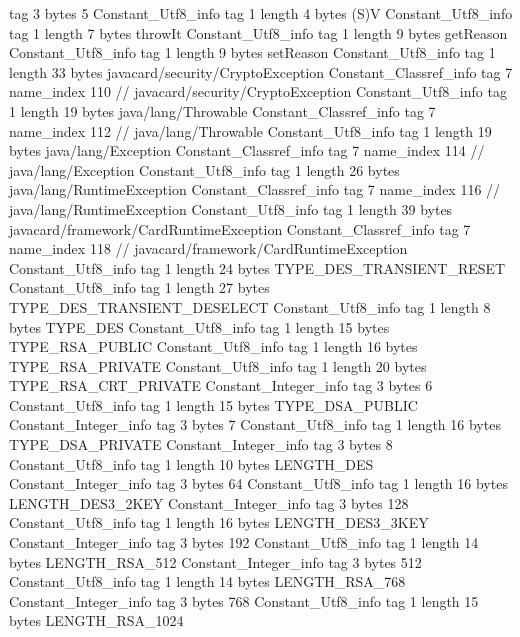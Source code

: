 {{{			tag	3
			bytes	5
		}
		Constant_Utf8_info {
			tag	1
			length	4
			bytes	(S)V
		}
		Constant_Utf8_info {
			tag	1
			length	7
			bytes	throwIt
		}
		Constant_Utf8_info {
			tag	1
			length	9
			bytes	getReason
		}
		Constant_Utf8_info {
			tag	1
			length	9
			bytes	setReason
		}
		Constant_Utf8_info {
			tag	1
			length	33
			bytes	javacard/security/CryptoException
		}
		Constant_Classref_info {
			tag	7
			name_index	110		// javacard/security/CryptoException
		}
		Constant_Utf8_info {
			tag	1
			length	19
			bytes	java/lang/Throwable
		}
		Constant_Classref_info {
			tag	7
			name_index	112		// java/lang/Throwable
		}
		Constant_Utf8_info {
			tag	1
			length	19
			bytes	java/lang/Exception
		}
		Constant_Classref_info {
			tag	7
			name_index	114		// java/lang/Exception
		}
		Constant_Utf8_info {
			tag	1
			length	26
			bytes	java/lang/RuntimeException
		}
		Constant_Classref_info {
			tag	7
			name_index	116		// java/lang/RuntimeException
		}
		Constant_Utf8_info {
			tag	1
			length	39
			bytes	javacard/framework/CardRuntimeException
		}
		Constant_Classref_info {
			tag	7
			name_index	118		// javacard/framework/CardRuntimeException
		}
		Constant_Utf8_info {
			tag	1
			length	24
			bytes	TYPE_DES_TRANSIENT_RESET
		}
		Constant_Utf8_info {
			tag	1
			length	27
			bytes	TYPE_DES_TRANSIENT_DESELECT
		}
		Constant_Utf8_info {
			tag	1
			length	8
			bytes	TYPE_DES
		}
		Constant_Utf8_info {
			tag	1
			length	15
			bytes	TYPE_RSA_PUBLIC
		}
		Constant_Utf8_info {
			tag	1
			length	16
			bytes	TYPE_RSA_PRIVATE
		}
		Constant_Utf8_info {
			tag	1
			length	20
			bytes	TYPE_RSA_CRT_PRIVATE
		}
		Constant_Integer_info {
			tag	3
			bytes	6
		}
		Constant_Utf8_info {
			tag	1
			length	15
			bytes	TYPE_DSA_PUBLIC
		}
		Constant_Integer_info {
			tag	3
			bytes	7
		}
		Constant_Utf8_info {
			tag	1
			length	16
			bytes	TYPE_DSA_PRIVATE
		}
		Constant_Integer_info {
			tag	3
			bytes	8
		}
		Constant_Utf8_info {
			tag	1
			length	10
			bytes	LENGTH_DES
		}
		Constant_Integer_info {
			tag	3
			bytes	64
		}
		Constant_Utf8_info {
			tag	1
			length	16
			bytes	LENGTH_DES3_2KEY
		}
		Constant_Integer_info {
			tag	3
			bytes	128
		}
		Constant_Utf8_info {
			tag	1
			length	16
			bytes	LENGTH_DES3_3KEY
		}
		Constant_Integer_info {
			tag	3
			bytes	192
		}
		Constant_Utf8_info {
			tag	1
			length	14
			bytes	LENGTH_RSA_512
		}
		Constant_Integer_info {
			tag	3
			bytes	512
		}
		Constant_Utf8_info {
			tag	1
			length	14
			bytes	LENGTH_RSA_768
		}
		Constant_Integer_info {
			tag	3
			bytes	768
		}
		Constant_Utf8_info {
			tag	1
			length	15
			bytes	LENGTH_RSA_1024
}}}
